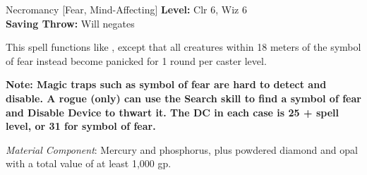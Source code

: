 {Necromancy [Fear, Mind-Affecting]}
{
	\textbf{Level:}
	Clr 6, Wiz 6\\
	\textbf{Saving Throw:}
	Will negates\\
}
{
	This spell functions like , except that all creatures within 18 meters of the symbol of fear instead become panicked for 1 round per caster level.

	\textbf{Note: Magic traps such as symbol of fear are hard to detect and disable. A rogue (only) can use the Search skill to find a symbol of fear and Disable Device to thwart it. The DC in each case is 25 + spell level, or 31 for symbol of fear.}

	\textit{Material Component}:
	Mercury and phosphorus, plus powdered diamond and opal with a total value of at least 1,000 gp.

}

